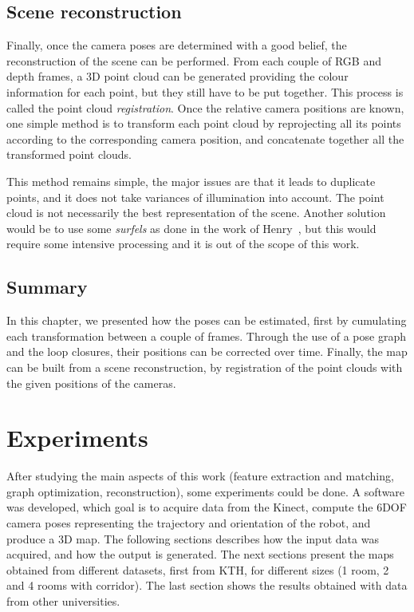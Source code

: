 \section{Scene reconstruction}

Finally, once the camera poses are determined with a good belief, the reconstruction of the scene can be performed. From each couple of RGB and depth frames, a 3D point cloud can be generated providing the colour information for each point, but they still have to be put together. This process is called the point cloud \emph{registration}. Once the relative camera positions are known, one simple method is to transform each point cloud by reprojecting all its points according to the corresponding camera position, and concatenate together all the transformed point clouds.

This method remains simple, the major issues are that it leads to duplicate points, and it does not take variances of illumination into account. The point cloud is not necessarily the best representation of the scene. Another solution would be to use some \emph{surfels} as done in the work of Henry~\cite{Henry_RGBD_2010}, but this would require some intensive processing and it is out of the scope of this work.

\section{Summary}

In this chapter, we presented how the poses can be estimated, first by cumulating each transformation between a couple of frames. Through the use of a pose graph and the loop closures, their positions can be corrected over time. Finally, the map can be built from a scene reconstruction, by registration of the point clouds with the given positions of the cameras.

\chapter{Experiments}
\label{chap:experiments}

After studying the main aspects of this work (feature extraction and matching, graph optimization, reconstruction), some experiments could be done. A software was developed, which goal is to acquire data from the Kinect, compute the 6DOF camera poses representing the trajectory and orientation of the robot, and produce a 3D map. The following sections describes how the input data was acquired, and how the output is generated. The next sections present the maps obtained from different datasets, first from KTH, for different sizes (1 room, 2 and 4 rooms with corridor). The last section shows the results obtained with data from other universities.

